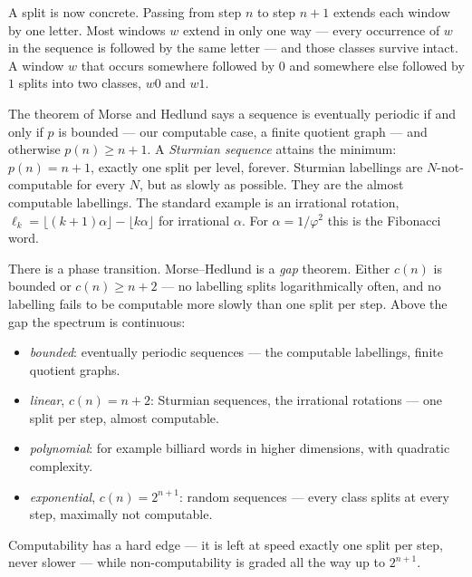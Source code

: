 \documentclass[11pt, a4paper]{article}
\theoremstyle{definition}
\theoremstyle{plain}
\begin{document}
A split is now concrete.  Passing from step $n$ to step $n+1$
extends each window by one letter.  Most windows $w$ extend in only
one way --- every occurrence of $w$ in the sequence is followed by
the same letter --- and those classes survive intact.  A window $w$
that occurs somewhere followed by $0$ and somewhere else followed by
$1$ splits into two classes, $w0$ and $w1$.

The theorem of Morse and Hedlund \cite{morsehedlund} says a sequence
is eventually periodic if and only if $p$ is bounded --- our
computable case, a finite quotient graph --- and otherwise
$p(n) \geq n+1$.  A \emph{Sturmian sequence}
\cite{morsehedlund2} attains the minimum: $p(n) = n+1$, exactly
one split per level, forever.  Sturmian labellings are
$N$-not-computable for every $N$, but as slowly as possible.  They are
the almost computable labellings.  The standard example is an
irrational rotation, $\ell_k = \lfloor (k+1)\alpha \rfloor - \lfloor
k\alpha \rfloor$ for irrational $\alpha$.  For $\alpha = 1/\varphi^2$
this is the Fibonacci word.

There is a phase transition.  Morse--Hedlund is a \emph{gap}
theorem.  Either $c(n)$ is bounded or $c(n) \geq n+2$ --- no
labelling splits logarithmically often, and no labelling fails to be
computable more slowly than one split per step.  Above the gap the
spectrum is continuous:
\begin{itemize}
  \item \emph{bounded}: eventually periodic sequences --- the
        computable labellings, finite quotient graphs.
  \item \emph{linear}, $c(n) = n+2$: Sturmian sequences, the
        irrational rotations --- one split per step, almost
        computable.
  \item \emph{polynomial}: for example billiard words in higher
        dimensions, with quadratic complexity.
  \item \emph{exponential}, $c(n) = 2^{n+1}$: random sequences ---
        every class splits at every step, maximally not computable.
\end{itemize}
Computability has a hard edge --- it is left at speed exactly one
split per step, never slower --- while non-computability is graded
all the way up to $2^{n+1}$.
\end{document}
